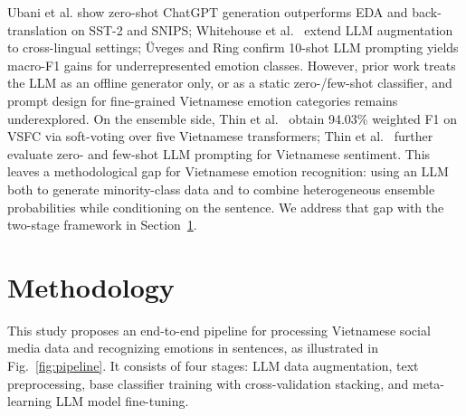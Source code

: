 \documentclass[conference]{IEEEtran}
\begin{document}
Ubani et al.\cite{ubani2023zeroshotdataaug} show zero-shot ChatGPT generation outperforms EDA
and back-translation on SST-2 and SNIPS; Whitehouse et al.\
\cite{whitehouse2023llmaug} extend LLM augmentation to cross-lingual settings; \"{U}veges and Ring
\cite{uveges2025synthetic} confirm 10-shot LLM prompting yields macro-F1 gains for
underrepresented emotion classes. However, prior work treats the LLM as an offline
generator only, or as a static zero-/few-shot classifier, and prompt design for
fine-grained Vietnamese emotion categories remains underexplored. On the ensemble
side, Thin et al.\ \cite{thin2024ensemble}
obtain 94.03\% weighted F1 on VSFC \cite{nguyen2018vsfc} via soft-voting over five Vietnamese transformers;
Thin et al.\ \cite{thin2024prompt} further evaluate zero- and few-shot LLM prompting for Vietnamese sentiment. This
leaves a methodological gap for Vietnamese emotion recognition: using an LLM both
to generate minority-class data and to combine heterogeneous ensemble probabilities
while conditioning on the sentence. We address that gap with the two-stage
framework in Section~\ref{sec:methodology}.

\section{Methodology}
\label{sec:methodology}

This study proposes an end-to-end pipeline for processing Vietnamese social media data and recognizing emotions in sentences, as illustrated in Fig.~\ref{fig:pipeline}. It consists of four stages: LLM data augmentation, text preprocessing, base classifier training with cross-validation stacking, and meta-learning LLM model fine-tuning.
\end{document}
